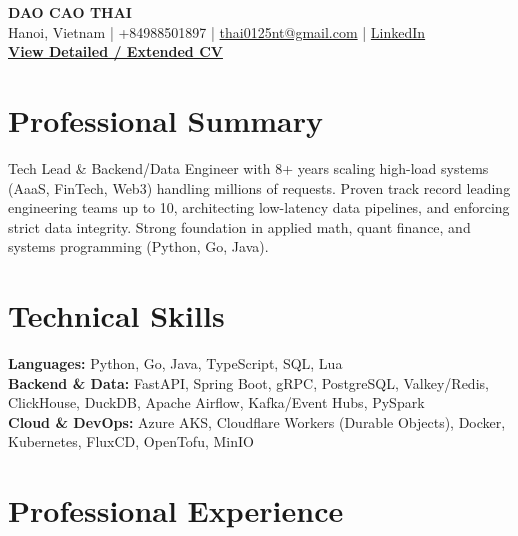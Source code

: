 \documentclass[8.5pt,a4paper]{extarticle}
\begin{document}
\begin{center}
    {\Large\textbf{DAO CAO THAI}} \\[2pt]
    \fontsize{8.5pt}{10pt}\selectfont
    Hanoi, Vietnam \;|\; +84988501897 \;|\;
    \href{mailto:thai0125nt@gmail.com}{thai0125nt@gmail.com} \;|\;
    \href{https://www.linkedin.com/in/đào-thái-08293b168/}{LinkedIn}\\
\textbf{\href{https://github.com/thai01255nt/resume/blob/master/Thai_Resume_Full.pdf}{View Detailed / Extended CV}}
\end{center}
\vspace{-4pt}

\section*{Professional Summary}
Tech Lead \& Backend/Data Engineer with 8+ years scaling high-load systems (AaaS, FinTech, Web3) handling millions of requests. Proven track record leading engineering teams up to 10, architecting low-latency data pipelines, and enforcing strict data integrity. Strong foundation in applied math, quant finance, and systems programming (Python, Go, Java).

\section*{Technical Skills}
\textbf{Languages:} Python, Go, Java, TypeScript, SQL, Lua\\
\textbf{Backend \& Data:} FastAPI, Spring Boot, gRPC, PostgreSQL, Valkey/Redis, ClickHouse, DuckDB, Apache Airflow, Kafka/Event Hubs, PySpark\\
\textbf{Cloud \& DevOps:} Azure AKS, Cloudflare Workers (Durable Objects), Docker, Kubernetes, FluxCD, OpenTofu, MinIO

\section*{Professional Experience}
\end{document}
